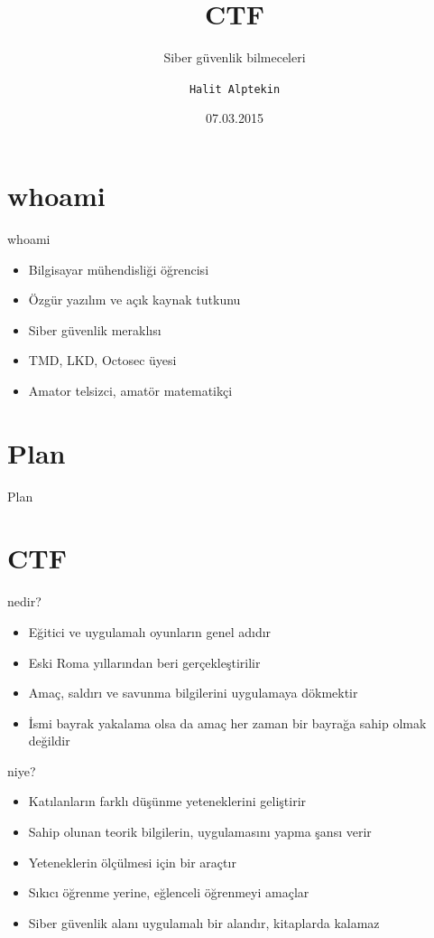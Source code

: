 \documentclass[compress]{beamer}
\title{CTF}
\subtitle{Siber güvenlik bilmeceleri}
\date{07.03.2015}
\author{\texttt{Halit Alptekin}}
\institute{BILMOK}
\begin{document}
\maketitle

\section*{whoami}
\begin{frame}{whoami}

\begin{itemize}
	\item Bilgisayar mühendisliği öğrencisi
	\item Özgür yazılım ve açık kaynak tutkunu
    \item Siber güvenlik meraklısı
    \item TMD, LKD, Octosec üyesi
    \item Amator telsizci, amatör matematikçi
\end{itemize}

\end{frame}

\section*{Plan}
\begin{frame}{Plan}
\tableofcontents[hideallsubsections]
\end{frame}


\section{CTF}

\begin{frame}{nedir?}

\begin{itemize}
	\item Eğitici ve uygulamalı oyunların genel adıdır
	\item Eski Roma yıllarından beri gerçekleştirilir
    \item Amaç, saldırı ve savunma bilgilerini uygulamaya dökmektir
    \item İsmi bayrak yakalama olsa da amaç her zaman bir bayrağa sahip olmak değildir
\end{itemize}

\end{frame}

\begin{frame}{niye?}

\begin{itemize}
	\item Katılanların farklı düşünme yeteneklerini geliştirir
    \item Sahip olunan teorik bilgilerin, uygulamasını yapma şansı verir
    \item Yeteneklerin ölçülmesi için bir araçtır
    \item Sıkıcı öğrenme yerine, eğlenceli öğrenmeyi amaçlar
    \item Siber güvenlik alanı uygulamalı bir alandır, kitaplarda kalamaz
\end{itemize}

\end{frame}
\end{document}
